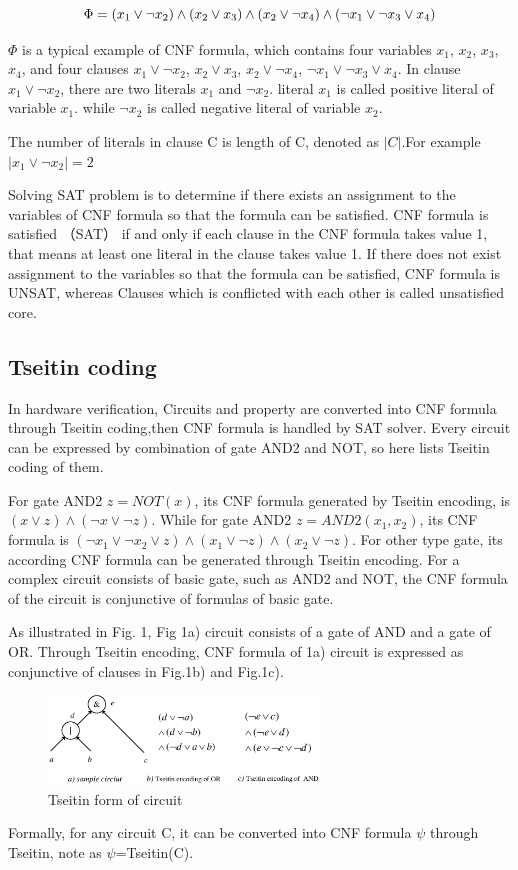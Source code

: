 \documentclass[runningheads,a4paper]{llncs}
\begin{document}
\begin{equation}
\centering \Phi=(x_1\vee \neg x_2)\wedge(x_2\vee x_3)\wedge(x_2\vee \neg x_4)\wedge( \neg x_1\vee \neg x_3\vee x_4)
\end{equation}

$\Phi$ is a typical example of CNF formula, which contains four variables $x_1$, $x_2$, $x_3$, $x_4$, 
and four clauses $x_1\vee \neg x_2$, $x_2\vee x_3$, $x_2\vee \neg x_4$, $ \neg x_1\vee \neg x_3\vee x_4$.
In clause $x_1\vee \neg x_2$, there are two literals $x_1$ and $ \neg x_2$.
literal $x_1$ is called positive literal of variable $x_1$.
while $ \neg x_2$ is called negative literal of variable $x_2$.

The number of literals in clause C is length of C, denoted as $|C|$.For example $| x_1\vee  \neg x_2 | =2$

Solving SAT problem is to determine if there exists an assignment to the variables of CNF formula so that the formula can be satisfied. 
CNF formula is satisfied （SAT） if and only if each clause in the CNF formula takes value 1, that means at least one literal in the clause takes value 1.
If there does not exist assignment to the variables so that the formula can be satisfied, CNF formula is UNSAT, whereas Clauses which is conflicted with each other is called unsatisfied core.
\subsection{Tseitin coding}

In hardware verification, Circuits and property are converted into CNF formula through Tseitin coding\cite{t4},then CNF formula is handled by SAT solver. 
Every circuit can be expressed by combination of gate AND2 and NOT, so here lists Tseitin coding of them. 

For gate AND2  $z=NOT(x)$, its CNF formula generated by Tseitin encoding, is  $(x\vee z)\wedge( \neg x\vee \neg z)$.
While for gate AND2 $z=AND2(x_1,x_2)$, its CNF formula is $( \neg x_1\vee \neg x_2\vee z)\wedge(x_1\vee \neg z) \wedge(x_2\vee \neg z)$.
For other type gate, its according CNF formula can be generated through Tseitin encoding.
For a complex circuit consists of basic gate, such as AND2 and NOT, the CNF formula of the circuit is conjunctive of formulas of basic gate.

As illustrated in Fig. 1, Fig 1a) circuit consists of a gate of AND and a gate of OR.
Through Tseitin encoding, CNF formula of 1a) circuit  is expressed as conjunctive of clauses in Fig.1b) and Fig.1c).
\begin{figure}
\centering
\includegraphics[width=7.2cm]{a1}
\caption{Tseitin form of circuit}
\end{figure}
Formally, for any circuit C, it can be converted into CNF formula $\psi$ through Tseitin, note as $\psi$=Tseitin(C).
\end{document}
